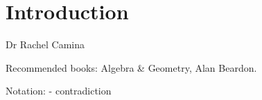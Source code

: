 \tableofcontents

\hypertarget{Introduction}{%
\section*{Introduction}\label{Introduction}}

Dr Rachel Camina

Recommended books: Algebra \& Geometry, Alan Beardon.

Notation: \Lightning - contradiction

\newpage








